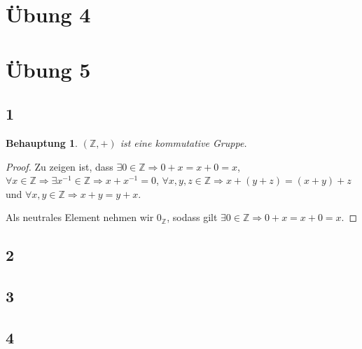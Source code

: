 \documentclass[a4paper,10pt]{article}
\newtheorem*{claim}{Behauptung}
\begin{document}
\section*{Übung 4}



\section*{Übung 5}

\subsection*{1}

\begin{claim}
 $(\mathbb{Z}, +)$ ist eine kommutative Gruppe.
\end{claim}

\begin{proof}
 Zu zeigen ist, dass $\exists 0 \in \mathbb{Z} \Rightarrow 0 + x = x + 0 = x$, $\forall x \in \mathbb{Z} \Rightarrow \exists x^{-1} \in \mathbb{Z} \Rightarrow x + x^{-1} = 0$, $\forall x, y, z \in \mathbb{Z} \Rightarrow x + (y + z) = (x + y) + z$ und $\forall x, y \in \mathbb{Z} \Rightarrow x + y = y + x$.
 
 Als neutrales Element nehmen wir $0_{\mathbb{Z}}$, sodass gilt $\exists 0 \in \mathbb{Z} \Rightarrow 0 + x = x + 0 = x$.
\end{proof}

\subsection*{2}

\subsection*{3}

\subsection*{4}
\end{document}
